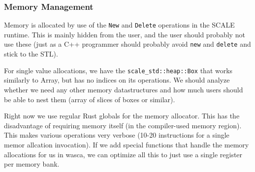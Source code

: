 \subsubsection{Memory Management}
Memory is allocated by use of the \verb|New| and \verb|Delete| operations in the
SCALE runtime.
This is mainly hidden from the user, and the user should probably not use these
(just as a C++ programmer should probably avoid \verb|new| and \verb|delete|
and stick to the STL).

For single value allocations, we have the \verb|scale_std::heap::Box| that works similarly to Array, but has no indices on its operations. We should analyze whether we need any other memory datastructures and how much users should be able to nest them (array of slices of boxes or similar).

Right now we use regular Rust globals for the memory allocator. This has the disadvantage of requiring memory itself (in the compiler-used memory region). This makes various operations very verbose (10-20 instructions for a single memor allcation invocation). If we add special functions that handle the memory allocations for us in wasca, we can optimize all this to just use a single register per memory bank.

